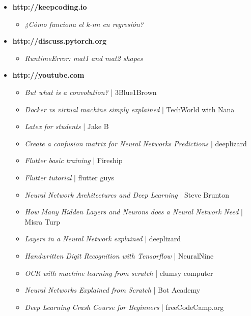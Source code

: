 \documentclass{article}
\begin{document}
\begin{spacing}{0.05}
\begin{small}
\begin{itemize}
        \item \textbf{http://keepcoding.io}
            \begin{itemize}
                \item \textit{¿Cómo funciona el k-nn en regresión?}
            \end{itemize}

        \item \textbf{http://discuss.pytorch.org}
            \begin{itemize}
                \item \textit{RuntimeError: mat1 and mat2 shapes}
            \end{itemize}

        \item \textbf{http://youtube.com}
            \begin{itemize}
                \item \textit{But what is a convolution? } | 3Blue1Brown
                \item \textit{Docker vs virtual machine simply explained} | TechWorld with Nana
                \item \textit{Latex for students} | Jake B
                \item \textit{Create a confusion matrix for Neural Networks Predictions} | deeplizard
                \item \textit{Flutter basic training} | Fireship
                \item \textit{Flutter tutorial} | flutter guys
                \item \textit{Neural Network Architectures and Deep Learning} | Steve Brunton
                \item \textit{How Many Hidden Layers and Neurons does a Neural Network Need} | Misra Turp
                \item \textit{Layers in a Neural Network explained} | deeplizard
                \item \textit{Handwritten Digit Recognition with Tensorflow} | NeuralNine
                \item \textit{OCR with machine learning from scratch} | clumsy computer
                \item \textit{Neural Networks Explained from Scratch} | Bot Academy
                \item \textit{Deep Learning Crash Course for Beginners} | freeCodeCamp.org
            \end{itemize}


\end{itemize}
\end{small}
\end{spacing}
\end{document}
